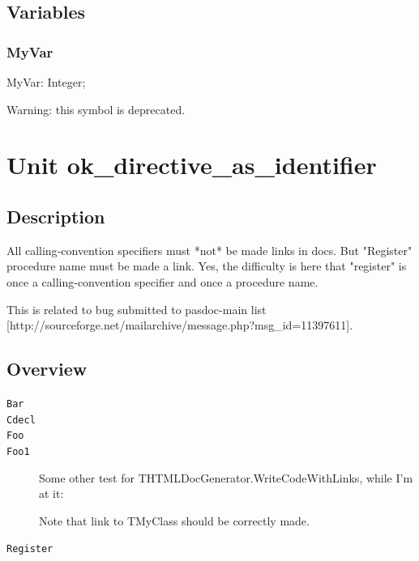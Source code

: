 \documentclass{report}
\begin{document}
\section{Variables}
\subsection*{MyVar}
\begin{list}{}{
\setlength{\itemindent}{0cm}
\setlength{\listparindent}{0cm}
\setlength{\leftmargin}{\evensidemargin}
\addtolength{\leftmargin}{\tmplength}
\settowidth{\labelsep}{X}
\addtolength{\leftmargin}{\labelsep}
\setlength{\labelwidth}{\tmplength}
}
\begin{flushleft}
\item[\textbf{Declaration}\hfill]
\begin{ttfamily}
MyVar: Integer;\end{ttfamily}


\end{flushleft}
\par
\item[\textbf{Description}]
Warning: this symbol is deprecated.

 

\end{list}
\chapter{Unit ok{\_}directive{\_}as{\_}identifier}
\section{Description}
All calling{-}convention specifiers must *not* be made links in docs. But "Register" procedure name must be made a link. Yes, the difficulty is here that "register" is once a calling{-}convention specifier and once a procedure name.

This is related to bug submitted to pasdoc{-}main list [http://sourceforge.net/mailarchive/message.php?msg{\_}id=11397611].
\section{Overview}
\begin{description}
\item[\texttt{\begin{ttfamily}TMyClass\end{ttfamily} Class}]
\end{description}
\begin{description}
\item[\texttt{Bar}]
\item[\texttt{Cdecl}]
\item[\texttt{Foo}]
\item[\texttt{Foo1}]Some other test for THTMLDocGenerator.WriteCodeWithLinks, while I'm at it:

Note that link to TMyClass should be correctly made.
\item[\texttt{Register}]
\end{description}
\end{document}

